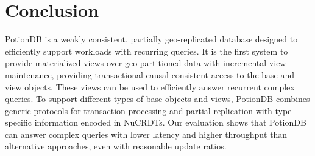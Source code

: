 \documentclass[sigplan,twocolumn,review,anonymous]{acmart}
\begin{document}

\section{Conclusion}
\label{sec:conclusion}

PotionDB is a weakly consistent, partially geo-replicated database designed to efficiently support
workloads with recurring queries. 
It is the first system to provide materialized views over geo-partitioned data with incremental view
maintenance, providing transactional causal consistent access to the base and view objects.
These views can be used to efficiently answer recurrent complex queries. 
To support different types of base objects and views, PotionDB combines generic protocols for transaction processing and partial replication 
with type-specific information encoded in NuCRDTs.
Our evaluation shows that PotionDB can answer complex queries with lower latency and higher 
throughput than alternative approaches, even with reasonable update ratios.


%
\end{document}
